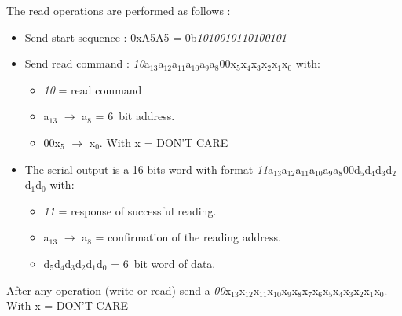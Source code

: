 \noindent The read operations are performed as follows :
\begin{itemize}
	\item Send start sequence : 0xA5A5 = 0b\textit{1010010110100101}
	\item Send read command : \textit{10}a$_{13}$a$_{12}$a$_{11}$a$_{10}$a$_{9}$a$_{8}$00x$_{5}$x$_{4}$x$_{3}$x$_{2}$x$_{1}$x$_{0}$ with:
	\begin{itemize}
		\item \textit{10} = read command
		\item a$_{13}$ $\rightarrow$ a$_{8}$ = 6~bit address.
		\item 00x$_{5}$ $\rightarrow$ x$_{0}$. With x = DON'T CARE 
	\end{itemize}
	\item The serial output is a 16 bits word with format \textit{11}a$_{13}$a$_{12}$a$_{11}$a$_{10}$a$_{9}$a$_{8}$00d$_{5}$d$_{4}$d$_{3}$d$_{2}$d$_{1}$d$_{0}$ with:
	\begin{itemize}
		\item \textit{11} = response of successful reading.
		\item a$_{13}$ $\rightarrow$ a$_{8}$ = confirmation of the reading address.
		\item d$_{5}$d$_{4}$d$_{3}$d$_{2}$d$_{1}$d$_{0}$ = 6~bit word of data.
	\end{itemize}
\end{itemize}
\noindent After any operation (write or read) send a \textit{00}x$_{13}$x$_{12}$x$_{11}$x$_{10}$x$_{9}$x$_{8}$x$_{7}$x$_{6}$x$_{5}$x$_{4}$x$_{3}$x$_{2}$x$_{1}$x$_{0}$. With x = DON'T CARE
